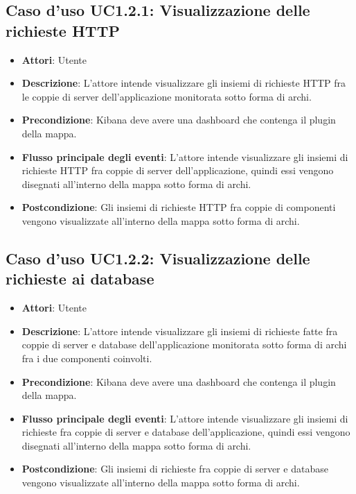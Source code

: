 \subsection{Caso d'uso UC1.2.1: Visualizzazione delle richieste HTTP}
\begin{itemize}
\item \textbf{Attori}: Utente
\item \textbf{Descrizione}: L'attore intende visualizzare gli insiemi di richieste HTTP fra le coppie di server dell'applicazione monitorata sotto forma di archi.
\item \textbf{Precondizione}: Kibana deve avere una dashboard che contenga il plugin della mappa.
\item \textbf{Flusso principale degli eventi}: L'attore intende visualizzare gli insiemi di richieste HTTP fra coppie di server dell'applicazione, quindi essi vengono disegnati all'interno della mappa sotto forma di archi.
\item \textbf{Postcondizione}: Gli insiemi di richieste HTTP fra coppie di componenti vengono visualizzate all'interno della mappa sotto forma di archi.
\end{itemize}
\subsection{Caso d'uso UC1.2.2: Visualizzazione delle richieste ai database}
\begin{itemize}
\item \textbf{Attori}: Utente
\item \textbf{Descrizione}: L'attore intende visualizzare gli insiemi di richieste fatte fra coppie  di server e database dell'applicazione monitorata sotto forma di archi fra i due componenti coinvolti.
\item \textbf{Precondizione}: Kibana deve avere una dashboard che contenga il plugin della mappa.
\item \textbf{Flusso principale degli eventi}: L'attore intende visualizzare gli insiemi di richieste fra coppie di server e database dell'applicazione, quindi essi vengono disegnati all'interno della mappa sotto forma di archi.
\item \textbf{Postcondizione}: Gli insiemi di richieste fra coppie di server e database vengono visualizzate all'interno della mappa sotto forma di archi.
\end{itemize}
